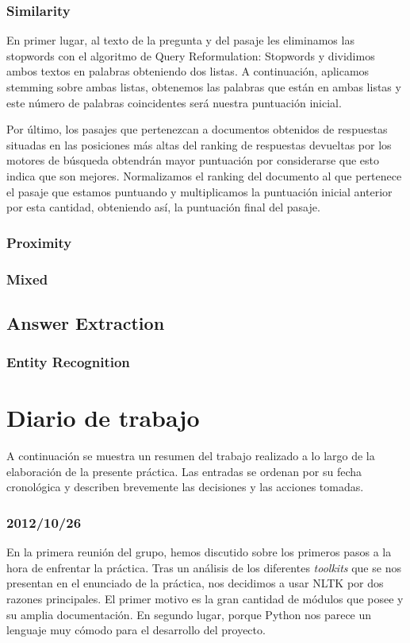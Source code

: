 \documentclass[12pt,a4paper,titlepage]{article}
\begin{document}
\subsubsection{Similarity}
En primer lugar, al texto de la pregunta y del pasaje les eliminamos las stopwords con el algoritmo de Query Reformulation: Stopwords y dividimos ambos textos en palabras obteniendo dos listas. A continuación, aplicamos stemming sobre ambas listas, obtenemos las palabras que están en ambas listas y este número de palabras coincidentes será nuestra puntuación inicial.

Por último, los pasajes que pertenezcan a documentos obtenidos de respuestas situadas en las posiciones más altas del ranking de respuestas devueltas por los motores de búsqueda obtendrán mayor puntuación por considerarse que esto indica que son mejores. Normalizamos el ranking del documento al que pertenece el pasaje que estamos puntuando y multiplicamos la puntuación inicial anterior por esta cantidad, obteniendo así, la puntuación final del pasaje.

\subsubsection{Proximity}

\subsubsection{Mixed}

\subsection{Answer Extraction}
\subsubsection{Entity Recognition}
\label{s:ne_recog}


\clearpage
\section{Diario de trabajo}
A continuación se muestra un resumen del trabajo realizado a lo largo de la elaboración de la presente práctica. Las entradas se ordenan por su fecha cronológica y describen brevemente las decisiones y las acciones tomadas.


\subsubsection*{2012/10/26}
En la primera reunión del grupo, hemos discutido sobre los primeros pasos a la hora de enfrentar la práctica. Tras un análisis de los diferentes \emph{toolkits} que se nos presentan en el enunciado de la práctica, nos decidimos a usar NLTK por dos razones principales. El primer motivo es la gran cantidad de módulos que posee y su amplia documentación. En segundo lugar, porque Python nos parece un lenguaje muy cómodo para el desarrollo del proyecto.
\end{document}
